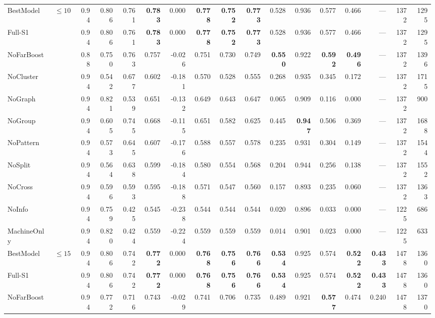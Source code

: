 \documentclass[9pt,a4paper,twocolumn]{extarticle}
\begin{document}
\begin{table}[tp]
\begin{tabular}{llrrrrrrrrrrrrrrr}
\midrule
BestModel & $\le 10$ & 0.94 & 0.806 & 0.761 & \textbf{0.783} & 0.000 & \textbf{0.778} & \textbf{0.752} & \textbf{0.773} & 0.528 & 0.936 & 0.577 & 0.466 & --- & 1372 & 1295 \\
Full-S1 &  & 0.94 & 0.806 & 0.761 & \textbf{0.783} & 0.000 & \textbf{0.778} & \textbf{0.752} & \textbf{0.773} & 0.528 & 0.936 & 0.577 & 0.466 & --- & 1372 & 1295 \\
NoFarBoost &  & 0.88 & 0.750 & 0.763 & 0.757 & -0.026 & 0.751 & 0.730 & 0.749 & \textbf{0.550} & 0.922 & \textbf{0.592} & \textbf{0.496} & --- & 1372 & 1396 \\
NoCluster &  & 0.94 & 0.542 & 0.677 & 0.602 & -0.181 & 0.570 & 0.528 & 0.555 & 0.268 & 0.935 & 0.345 & 0.172 & --- & 1372 & 1715 \\
NoGraph &  & 0.94 & 0.821 & 0.539 & 0.651 & -0.132 & 0.649 & 0.643 & 0.647 & 0.065 & 0.909 & 0.116 & 0.000 & --- & 1372 & 900 \\
NoGroup &  & 0.94 & 0.605 & 0.745 & 0.668 & -0.115 & 0.651 & 0.582 & 0.625 & 0.445 & \textbf{0.947} & 0.506 & 0.369 & --- & 1372 & 1688 \\
NoPattern &  & 0.94 & 0.573 & 0.645 & 0.607 & -0.176 & 0.588 & 0.557 & 0.578 & 0.235 & 0.931 & 0.304 & 0.149 & --- & 1372 & 1544 \\
NoSplit &  & 0.94 & 0.564 & 0.638 & 0.599 & -0.184 & 0.580 & 0.554 & 0.568 & 0.204 & 0.944 & 0.256 & 0.138 & --- & 1372 & 1552 \\
NoCross &  & 0.94 & 0.596 & 0.593 & 0.595 & -0.188 & 0.571 & 0.547 & 0.560 & 0.157 & 0.893 & 0.235 & 0.060 & --- & 1372 & 1363 \\
NoInfo &  & 0.94 & 0.759 & 0.425 & 0.545 & -0.238 & 0.544 & 0.544 & 0.544 & 0.020 & 0.896 & 0.033 & 0.000 & --- & 1225 & 686 \\
MachineOnly &  & 0.94 & 0.820 & 0.424 & 0.559 & -0.224 & 0.559 & 0.559 & 0.559 & 0.014 & 0.901 & 0.023 & 0.000 & --- & 1225 & 633 \\
\midrule
BestModel & $\le 15$ & 0.94 & 0.806 & 0.742 & \textbf{0.772} & 0.000 & \textbf{0.768} & \textbf{0.756} & \textbf{0.766} & \textbf{0.534} & 0.925 & 0.574 & \textbf{0.522} & \textbf{0.433} & 1478 & 1360 \\
Full-S1 &  & 0.94 & 0.806 & 0.742 & \textbf{0.772} & 0.000 & \textbf{0.768} & \textbf{0.756} & \textbf{0.766} & \textbf{0.534} & 0.925 & 0.574 & \textbf{0.522} & \textbf{0.433} & 1478 & 1360 \\
NoFarBoost &  & 0.94 & 0.772 & 0.716 & 0.743 & -0.029 & 0.741 & 0.706 & 0.735 & 0.489 & 0.921 & \textbf{0.577} & 0.474 & 0.240 & 1478 & 1370 \\

\end{tabular}
\end{table}
\end{document}
